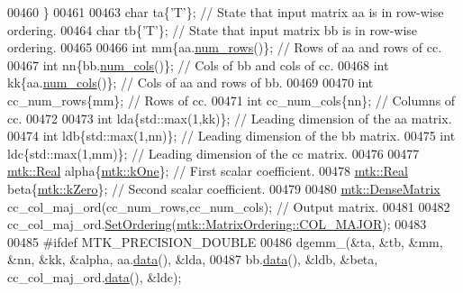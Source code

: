 \begin{DoxyCode}
00460   \}
00461 
00463   \textcolor{keywordtype}{char} ta\{\textcolor{charliteral}{'T'}\}; \textcolor{comment}{// State that input matrix aa is in row-wise ordering.}
00464   \textcolor{keywordtype}{char} tb\{\textcolor{charliteral}{'T'}\}; \textcolor{comment}{// State that input matrix bb is in row-wise ordering.}
00465 
00466   \textcolor{keywordtype}{int} mm\{aa.\hyperlink{classmtk_1_1DenseMatrix_a53f3afb3b6a8d21854458aaa9663cc74}{num\_rows}()\};  \textcolor{comment}{// Rows of aa and rows of cc.}
00467   \textcolor{keywordtype}{int} nn\{bb.\hyperlink{classmtk_1_1DenseMatrix_a41747502d468c6728a4be31501b16e0e}{num\_cols}()\};  \textcolor{comment}{// Cols of bb and cols of cc.}
00468   \textcolor{keywordtype}{int} kk\{aa.\hyperlink{classmtk_1_1DenseMatrix_a41747502d468c6728a4be31501b16e0e}{num\_cols}()\};  \textcolor{comment}{// Cols of aa and rows of bb.}
00469 
00470   \textcolor{keywordtype}{int} cc\_num\_rows\{mm\};  \textcolor{comment}{// Rows of cc.}
00471   \textcolor{keywordtype}{int} cc\_num\_cols\{nn\};  \textcolor{comment}{// Columns of cc.}
00472 
00473   \textcolor{keywordtype}{int} lda\{std::max(1,kk)\};  \textcolor{comment}{// Leading dimension of the aa matrix.}
00474   \textcolor{keywordtype}{int} ldb\{std::max(1,nn)\};  \textcolor{comment}{// Leading dimension of the bb matrix.}
00475   \textcolor{keywordtype}{int} ldc\{std::max(1,mm)\};  \textcolor{comment}{// Leading dimension of the cc matrix.}
00476 
00477   \hyperlink{group__c01-roots_gac080bbbf5cbb5502c9f00405f894857d}{mtk::Real} alpha\{\hyperlink{group__c01-roots_ga26407c24d43b6b95480943340d285c71}{mtk::kOne}\}; \textcolor{comment}{// First scalar coefficient.}
00478   \hyperlink{group__c01-roots_gac080bbbf5cbb5502c9f00405f894857d}{mtk::Real} beta\{\hyperlink{group__c01-roots_ga59a451a5fae30d59649bcda274fea271}{mtk::kZero}\}; \textcolor{comment}{// Second scalar coefficient.}
00479 
00480   \hyperlink{classmtk_1_1DenseMatrix}{mtk::DenseMatrix} cc\_col\_maj\_ord(cc\_num\_rows,cc\_num\_cols); \textcolor{comment}{// Output matrix.}
00481 
00482   cc\_col\_maj\_ord.\hyperlink{classmtk_1_1DenseMatrix_a178e63f365cf8c547dc5020c60357f5e}{SetOrdering}(\hyperlink{namespacemtk_ga622801bd9f912d0f976c3e383f5f581ca34d2765ffc490951febdcca04bc4f7cd}{mtk::MatrixOrdering::COL\_MAJOR});
00483 
00485 \textcolor{preprocessor}{  #ifdef MTK\_PRECISION\_DOUBLE}
00486   dgemm\_(&ta, &tb, &mm, &nn, &kk, &alpha, aa.\hyperlink{classmtk_1_1DenseMatrix_a0c33b8a9e01d157c61ddbdf807c25d84}{data}(), &lda,
00487          bb.\hyperlink{classmtk_1_1DenseMatrix_a0c33b8a9e01d157c61ddbdf807c25d84}{data}(), &ldb, &beta, cc\_col\_maj\_ord.\hyperlink{classmtk_1_1DenseMatrix_a0c33b8a9e01d157c61ddbdf807c25d84}{data}(), &ldc);

\end{DoxyCode}

